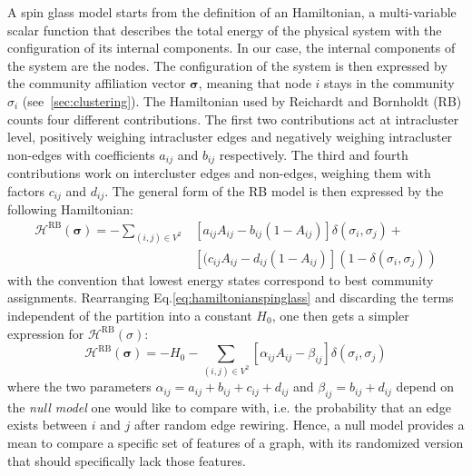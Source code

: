 A spin glass model starts from the definition of an Hamiltonian, a multi-variable scalar function that describes the total energy of the physical system with the configuration of its internal components. In our case, the internal components of the system are the nodes. The configuration of the system is then expressed by the community affiliation vector $\boldsymbol\sigma$, meaning that node $i$ stays in the community $\sigma_i$ (see~\ref{sec:clustering}).
The Hamiltonian used by Reichardt and Bornholdt (RB) counts four different contributions. The first two contributions act at intracluster level, positively weighing intracluster edges and negatively weighing intracluster non-edges with coefficients $a_{ij}$ and $b_{ij}$ respectively. The third and fourth contributions work on intercluster edges and non-edges, weighing them with factors $c_{ij}$ and $d_{ij}$. The general form of the RB model is then expressed by the following Hamiltonian:
\begin{align}\label{eq:hamiltonianspinglass}
\mathcal{H}^{\textrm{RB}}(\boldsymbol \sigma) = - \sum_{(i,j)\in V^2} & \left[ a_{ij} A_{ij} - b_{ij}(1-A_{ij}) \right] \delta(\sigma_i,\sigma_j) + \nonumber \\ &  \left[ (c_{ij} A_{ij} - d_{ij}(1-A_{ij}) \right] (1-\delta(\sigma_i,\sigma_j))
\end{align}
with the convention that lowest energy states correspond to best community assignments.
Rearranging Eq.\ref{eq:hamiltonianspinglass} and discarding the terms independent of the partition into a constant $H_0$, one then gets a simpler expression for $\mathcal{H}^{\textrm{RB}}(\sigma)$:
\begin{equation}\label{eq:rbspinglass}
\mathcal{H}^{\textrm{RB}}(\boldsymbol \sigma) = -H_0 - \sum \limits_{(i,j)\in V^2} \left[ \alpha_{ij} A_{ij} - \beta_{ij} \right] \delta(\sigma_i,\sigma_j)
\end{equation}
where the two parameters $\alpha_{ij}=a_{ij}+b_{ij}+c_{ij}+d_{ij}$ and $\beta_{ij}=b_{ij}+d_{ij}$ depend on the \emph{null model} one would like to compare with, i.e. the probability that an edge exists between $i$ and $j$ after random edge rewiring. Hence, a null model provides a mean to compare a specific set of features of a graph, with its randomized version that should specifically lack those features.


